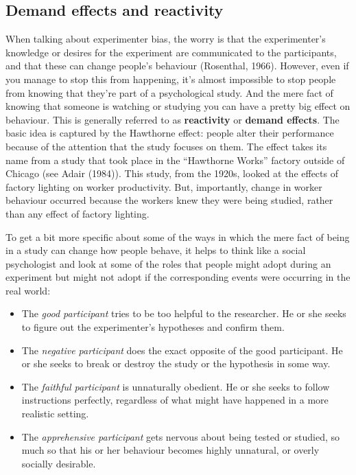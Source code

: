 \documentclass[
  a4paper,
]{book}
\providecommand{\tightlist}{%
  \setlength{\itemsep}{0pt}\setlength{\parskip}{0pt}}\usepackage{longtable,booktabs,array}
\begin{document}
\hypertarget{demand-effects-and-reactivity}{%
\subsection{Demand effects and
reactivity}\label{demand-effects-and-reactivity}}

When talking about experimenter bias, the worry is that the
experimenter's knowledge or desires for the experiment are communicated
to the participants, and that these can change people's behaviour
(Rosenthal, 1966). However, even if you manage to stop this from
happening, it's almost impossible to stop people from knowing that
they're part of a psychological study. And the mere fact of knowing that
someone is watching or studying you can have a pretty big effect on
behaviour. This is generally referred to as \textbf{reactivity} or
\textbf{demand effects}. The basic idea is captured by the Hawthorne
effect: people alter their performance because of the attention that the
study focuses on them. The effect takes its name from a study that took
place in the ``Hawthorne Works'' factory outside of Chicago (see Adair
(1984)). This study, from the 1920s, looked at the effects of factory
lighting on worker productivity. But, importantly, change in worker
behaviour occurred because the workers knew they were being studied,
rather than any effect of factory lighting.

To get a bit more specific about some of the ways in which the mere fact
of being in a study can change how people behave, it helps to think like
a social psychologist and look at some of the roles that people might
adopt during an experiment but might not adopt if the corresponding
events were occurring in the real world:

\begin{itemize}
\tightlist
\item
  The \emph{good participant} tries to be too helpful to the researcher.
  He or she seeks to figure out the experimenter's hypotheses and
  confirm them.
\item
  The \emph{negative participant} does the exact opposite of the good
  participant. He or she seeks to break or destroy the study or the
  hypothesis in some way.
\item
  The \emph{faithful participant} is unnaturally obedient. He or she
  seeks to follow instructions perfectly, regardless of what might have
  happened in a more realistic setting.
\item
  The \emph{apprehensive participant} gets nervous about being tested or
  studied, so much so that his or her behaviour becomes highly
  unnatural, or overly socially desirable.
\end{itemize}
\end{document}
